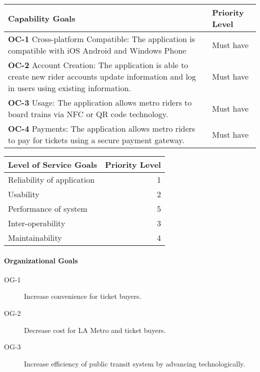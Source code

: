 \begin{table}[h]
    \begin{tabularx}{\textwidth}{Xl}\hline
    Capability Goals                                                                                                                             &  Priority Level \\
    \hline
    \textbf{OC-1} Cross-platform Compatible: The application is compatible with iOS Android and Windows Phone                                             &  Must have      \\
    \textbf{OC-2} Account Creation: The application is able to create new rider accounts update information  and log in users using existing information. & Must have       \\
    \textbf{OC-3} Usage: The application allows metro riders to board trains via NFC or QR code technology.                                               & Must have       \\
    \textbf{OC-4} Payments: The application allows metro riders to pay for tickets using a secure payment gateway.                                        & Must have       \\
    \hline
    \end{tabularx}
\end{table}

\begin{table}[h]
    \begin{tabularx}{\textwidth}{Xr}\hline
    Level of Service Goals     & Priority Level \\
    \hline
    Reliability of application & 1              \\
    Usability                  & 2              \\
    Performance of system      & 5              \\
    Inter-operability          & 3              \\
    Maintainability            & 4              \\
    \hline
    \end{tabularx}
\end{table}


\paragraph{Organizational Goals}\begin{description}
	\item[OG-1] Increase convenience for ticket buyers.
	\item[OG-2] Decrease cost for LA Metro and ticket buyers. 
	\item[OG-3] Increase efficiency of public transit system by advancing technologically.
\end{description}


